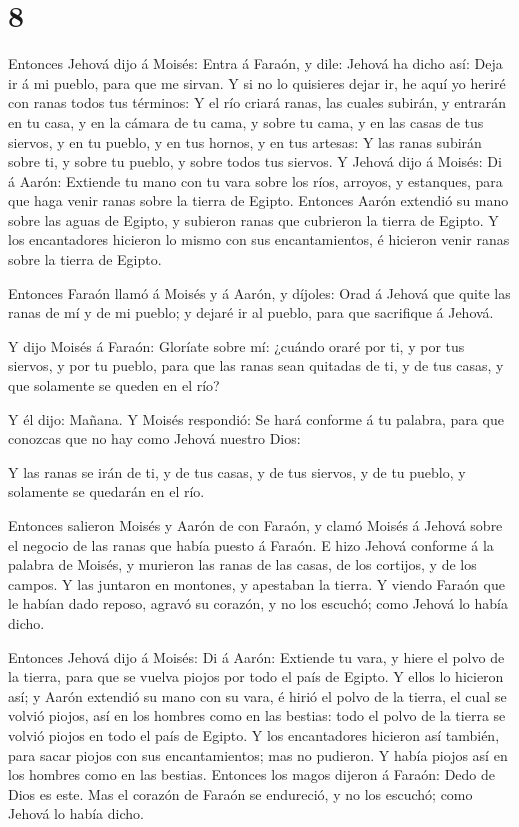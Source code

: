 \hypertarget{section-7}{%
\section{8}\label{section-7}}

 Entonces Jehová dijo á Moisés: Entra á Faraón, y dile:
Jehová ha dicho así: Deja ir á mi pueblo, para que me sirvan.
 Y si no lo quisieres dejar ir, he aquí yo heriré con ranas
todos tus términos:  Y el río criará ranas, las cuales
subirán, y entrarán en tu casa, y en la cámara de tu cama, y sobre tu
cama, y en las casas de tus siervos, y en tu pueblo, y en tus hornos, y
en tus artesas:  Y las ranas subirán sobre ti, y sobre tu
pueblo, y sobre todos tus siervos.  Y Jehová dijo á Moisés:
Di á Aarón: Extiende tu mano con tu vara sobre los ríos, arroyos, y
estanques, para que haga venir ranas sobre la tierra de Egipto.
 Entonces Aarón extendió su mano sobre las aguas de Egipto,
y subieron ranas que cubrieron la tierra de Egipto.  Y los
encantadores hicieron lo mismo con sus encantamientos, é hicieron venir
ranas sobre la tierra de Egipto.

 Entonces Faraón llamó á Moisés y á Aarón, y díjoles: Orad á
Jehová que quite las ranas de mí y de mi pueblo; y dejaré ir al pueblo,
para que sacrifique á Jehová.

 Y dijo Moisés á Faraón: Gloríate sobre mí: ¿cuándo oraré
por ti, y por tus siervos, y por tu pueblo, para que las ranas sean
quitadas de ti, y de tus casas, y que solamente se queden en el río?

 Y él dijo: Mañana. Y Moisés respondió: Se hará conforme á
tu palabra, para que conozcas que no hay como Jehová nuestro Dios:

 Y las ranas se irán de ti, y de tus casas, y de tus
siervos, y de tu pueblo, y solamente se quedarán en el río.

 Entonces salieron Moisés y Aarón de con Faraón, y clamó
Moisés á Jehová sobre el negocio de las ranas que había puesto á Faraón.
 E hizo Jehová conforme á la palabra de Moisés, y murieron
las ranas de las casas, de los cortijos, y de los campos. 
Y las juntaron en montones, y apestaban la tierra.  Y
viendo Faraón que le habían dado reposo, agravó su corazón, y no los
escuchó; como Jehová lo había dicho.

 Entonces Jehová dijo á Moisés: Di á Aarón: Extiende tu
vara, y hiere el polvo de la tierra, para que se vuelva piojos por todo
el país de Egipto.  Y ellos lo hicieron así; y Aarón
extendió su mano con su vara, é hirió el polvo de la tierra, el cual se
volvió piojos, así en los hombres como en las bestias: todo el polvo de
la tierra se volvió piojos en todo el país de Egipto.  Y
los encantadores hicieron así también, para sacar piojos con sus
encantamientos; mas no pudieron. Y había piojos así en los hombres como
en las bestias.  Entonces los magos dijeron á Faraón: Dedo
de Dios es este. Mas el corazón de Faraón se endureció, y no los
escuchó; como Jehová lo había dicho.

